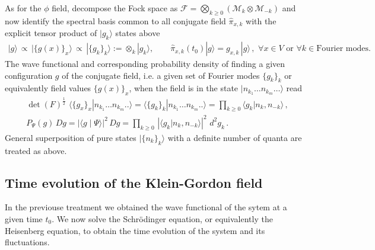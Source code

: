 \documentclass[../QFT_main.tex]{subfiles}
\begin{document}
\begin{mytheorem}
As for the $\phi$ field, decompose the Fock space as $\mathcal{F}= \bigotimes_{k\geq 0}(\mathcal{M}_k\otimes\mathcal{M}_{-k})$ and now identify the spectral basis common to all conjugate field $\hat{\pi}_{x,k}$ with the explicit tensor product of $|g_k\rangle$ states above
\begin{align}
    |g\rangle \,\propto\, |\{g(x)\}_x\rangle \,\propto\, |\{g_k\}_k\rangle := \otimes_k |g_k\rangle, \qquad \hat{\pi}_{x,k}(t_0) |g\rangle = g_{x,k} \,|g\rangle\,, \,\,\forall x\in V\text{ or } \forall k\in\text{Fourier modes.}
\end{align}
The wave functional and corresponding probability density of finding a given configuration $g$ of the conjugate field, i.e. a given set of Fourier modes $\{g_k\}_k$ or equivalently field values $\{g(x)\}_x$, when the field is in the state $|n_{k_1}\dots n_{k_m}\dots \rangle$ read
\begin{align}
    &\det(F)^{\frac{1}{2}}\,\,\langle \{g_x\}_x |n_{k_1}\dots n_{k_m}.. \rangle =\langle \{g_k\}_k |n_{k_1}\dots n_{k_m}.. \rangle = \prod_{k\geq0} \langle g_k | n_{k},n_{-k} \rangle\,,\\
    &P_{\Psi}(g)\, Dg = |\langle g \mid \Psi\rangle|^2 \,Dg= \prod_{k\geq0}\, \left|\langle g_k | n_{k},n_{-k} \rangle\right|^2\,\,d^2\!g_k\,.
\end{align}
General superposition of pure states $|\{n_k\}_k\rangle$ with a definite number of quanta are treated as above.
%
\end{mytheorem}


\subsection{Time evolution of the Klein-Gordon field}

In the previouse treatment we obtained the wave functional of the sytem at a given time $t_0$.
We now solve the Schrödinger equation, or equivalently the Heisenberg equation, to obtain the time evolution of the system and its fluctuations.
\end{document}
